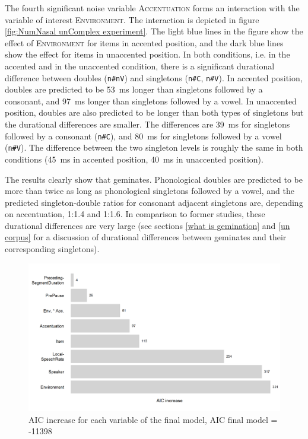 The fourth significant noise variable \textsc{Accentuation} forms an interaction with the variable of interest \textsc{Environment}. The interaction is depicted in figure \ref{fig:NumNasal unComplex experiment}.
The light blue lines in the figure show the effect of \textsc{Environment} for items in accented position, and the dark blue lines show the effect for items in unaccented position. In both conditions, i.e. in the accented and in the unaccented condition, there is a significant durational difference between doubles (\texttt{n\#nV}) and singletons (\texttt{n\#C}, \texttt{n\#V}). 
 In accented position, doubles are predicted to be 53~ms longer than singletons followed by a consonant, and 97~ms longer than singletons followed by a vowel. 
 In unaccented position, doubles are also predicted to be longer than both types of singletons but the durational differences are smaller. The differences are 39~ms  for singletons followed by a consonant (\texttt{n\#C}), and 80~ms for singletons followed by a vowel (\texttt{n\#V}). The difference between the two singleton levels is roughly the same in both conditions (45~ms in accented position, 40~ms in unaccented position).




 The results clearly show that  geminates. Phonological doubles are predicted to be more than twice as long as phonological singletons followed by a vowel, and the predicted singleton-double ratios for consonant adjacent singletons are, depending on accentuation, 1:1.4 and 1:1.6. In comparison to former studies, these durational differences are very large (see sections \ref{what is gemination} and \ref{un corpus} for a discussion of durational differences between geminates and their corresponding singletons). 




\begin{figure}[t!]
	\centering
	
	\includegraphics[scale=0.7] {images/Experiment/AICdecreaseUnComplex.png}


	\caption{AIC increase for each variable of the final model, AIC final model = -11398}
	\label{fig:Effect sozed un Exp unV vs Unn}

\end{figure}



